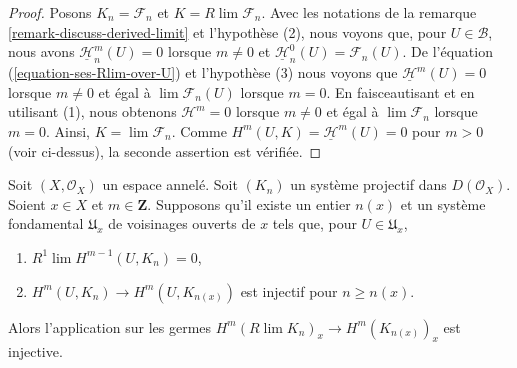 \begin{proof}

Posons $K_n = \mathcal{F}_n$ et $K = R\lim \mathcal{F}_n$. Avec les notations de la remarque \ref{remark-discuss-derived-limit} et l'hypothèse (2), nous voyons que, pour
$U \in \mathcal{B}$, nous avons $\underline{\mathcal{H}}_n^m(U) = 0$
lorsque $m \not = 0$ et $\underline{\mathcal{H}}_n^0(U) = \mathcal{F}_n(U)$. De l'équation (\ref{equation-ses-Rlim-over-U}) et l'hypothèse (3) nous voyons que $\underline{\mathcal{H}}^m(U) = 0$
lorsque $m \not = 0$ et égal à $\lim \mathcal{F}_n(U)$
lorsque $m = 0$. En faisceautisant et en utilisant (1), nous obtenons
$\mathcal{H}^m = 0$ lorsque $m \not = 0$ et égal à
$\lim \mathcal{F}_n$ lorsque $m = 0$. Ainsi, $K = \lim \mathcal{F}_n$. Comme $H^m(U, K) = \underline{\mathcal{H}}^m(U) = 0$ pour $m > 0$
(voir ci-dessus), la seconde assertion est vérifiée.

\end{proof}

\begin{lemma}

\label{lemma-cohomology-derived-limit-injective}

Soit $(X, \mathcal{O}_X)$ un espace annelé. Soit $(K_n)$ un système projectif dans $D(\mathcal{O}_X)$. Soient $x \in X$ et $m \in \mathbf{Z}$. Supposons qu'il existe un entier $n(x)$ et un système fondamental $\mathfrak{U}_x$
de voisinages ouverts de $x$ tels que, pour $U \in \mathfrak{U}_x$,

\begin{enumerate}

\item  $R^1\lim H^{m - 1}(U, K_n) = 0$,
\item  $H^m(U, K_n) \to H^m(U, K_{n(x)})$ est injectif pour $n \geq n(x)$.

\end{enumerate}

Alors l'application sur les germes $H^m(R\lim K_n)_x \to H^m(K_{n(x)})_x$ est injective.

\end{lemma}

